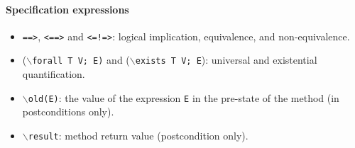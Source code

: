 \documentclass[a4paper]{llncs}
\begin{document}
\paragraph{\bf Specification expressions} 
\begin{itemize} 
\item{\texttt{==>}, \texttt{<==>} and \texttt{<=!=>}}: logical
implication, equivalence, and non-equivalence. 
 
\item {($\backslash$\texttt{forall T V; E)} and 
($\backslash$\texttt{exists T V; E})}: universal and existential
quantification. 
 
\item{\texttt{$\backslash$old(E)}}: 
the value of the expression \texttt{E} in the pre-state of the method
(in postconditions only).
 
\item {\tt$\backslash$result}: method return value (postcondition
only).
\end{itemize} 
\end{document}
